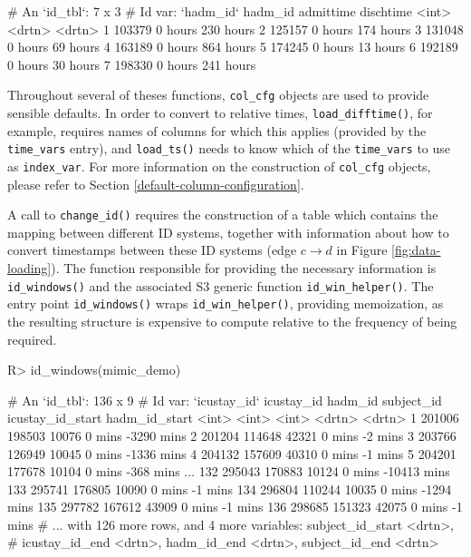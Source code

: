 \documentclass[
  notitle,
  nojss,
  noheadings]{jss}
\begin{document}
\begin{CodeChunk}
\begin{CodeOutput}
# An `id_tbl`: 7 x 3
# Id var:      `hadm_id`
  hadm_id admittime dischtime
    <int> <drtn>    <drtn>
1  103379 0 hours   230 hours
2  125157 0 hours   174 hours
3  131048 0 hours    69 hours
4  163189 0 hours   864 hours
5  174245 0 hours    13 hours
6  192189 0 hours    30 hours
7  198330 0 hours   241 hours
\end{CodeOutput}
\end{CodeChunk}

Throughout several of theses functions, \texttt{col\_cfg} objects are
used to provide sensible defaults. In order to convert to relative
times, \texttt{load\_difftime()}, for example, requires names of columns
for which this applies (provided by the \texttt{time\_vars} entry), and
\texttt{load\_ts()} needs to know which of the \texttt{time\_vars} to
use as \texttt{index\_var}. For more information on the construction of
\texttt{col\_cfg} objects, please refer to Section
\ref{default-column-configuration}.

A call to \texttt{change\_id()} requires the construction of a table
which contains the mapping between different ID systems, together with
information about how to convert timestamps between these ID systems
(edge \(c \to d\) in Figure \ref{fig:data-loading}). The function
responsible for providing the necessary information is
\texttt{id\_windows()} and the associated S3 generic function
\texttt{id\_win\_helper()}. The entry point \texttt{id\_windows()} wraps
\texttt{id\_win\_helper()}, providing memoization, as the resulting
structure is expensive to compute relative to the frequency of being
required.

\begin{CodeChunk}
\begin{CodeInput}
R> id_windows(mimic_demo)
\end{CodeInput}
\begin{CodeOutput}
# An `id_tbl`: 136 x 9
# Id var:      `icustay_id`
    icustay_id hadm_id subject_id icustay_id_start hadm_id_start
         <int>   <int>      <int> <drtn>           <drtn>
  1     201006  198503      10076 0 mins            -3290 mins
  2     201204  114648      42321 0 mins               -2 mins
  3     203766  126949      10045 0 mins            -1336 mins
  4     204132  157609      40310 0 mins               -1 mins
  5     204201  177678      10104 0 mins             -368 mins
...
132     295043  170883      10124 0 mins           -10413 mins
133     295741  176805      10090 0 mins               -1 mins
134     296804  110244      10035 0 mins            -1294 mins
135     297782  167612      43909 0 mins               -1 mins
136     298685  151323      42075 0 mins               -1 mins
# ... with 126 more rows, and 4 more variables: subject_id_start <drtn>,
#   icustay_id_end <drtn>, hadm_id_end <drtn>, subject_id_end <drtn>
\end{CodeOutput}
\end{CodeChunk}
\end{document}
